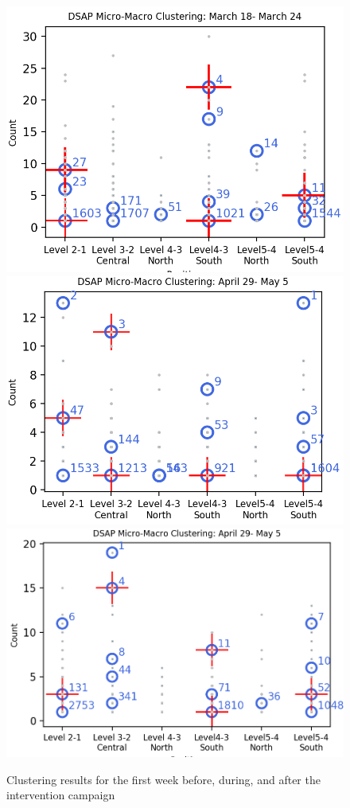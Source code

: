 \begin{figure}[!t]
    \centering
    \includegraphics[width=.47\textwidth]{image/Chapters/Chapter6/beforeInte1week.png}
    \includegraphics[width=.5\textwidth]{image/Chapters/Chapter6/duringInte1week.png}
    \includegraphics[width=.5\textwidth]{image/Chapters/Chapter6/afterInte1week.png}
    \caption{Clustering results for the first week before, during, and after the intervention campaign}
    \label{dsap3week}
\end{figure}





